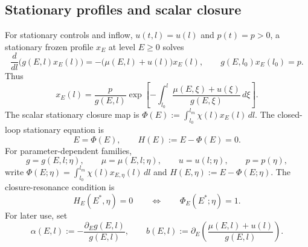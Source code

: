 \documentclass[pdflatex,sn-mathphys-num]{sn-jnl}
\theoremstyle{thmstyleone}
\theoremstyle{definition}
\theoremstyle{remark}
\numberwithin{equation}{section}
\begin{document}
\subsection{Stationary profiles and scalar closure}
\label{subsec:model-stationary}
For stationary controls and inflow,
$u(t,l)=u(l)$ and
$p(t)=p>0$,
a stationary frozen profile \(x_E\) at level \(E\ge0\) solves
\[
\frac{d}{dl}\big(g(E,l)x_E(l)\big)
=
-\big(\mu(E,l)+u(l)\big)x_E(l),
\qquad
g(E,l_0)x_E(l_0)=p .
\]
Thus
\begin{equation}
\label{eq:model-stationary-profile}
x_E(l)
=
\frac{p}{g(E,l)}
\exp\!\left[
-\int_{l_0}^{l}
\frac{\mu(E,\xi)+u(\xi)}{g(E,\xi)}\,d\xi
\right].
\end{equation}
The scalar stationary closure map is
$\displaystyle \Phi(E):=
\int_{l_0}^{l_m}\chi(l)x_E(l)\,dl$.
The closed-loop stationary equation is
\[
E=\Phi(E),
\qquad
H(E):=E-\Phi(E)=0 .
\]
For parameter-dependent families,
\[
g=g(E,l;\eta),
\qquad
\mu=\mu(E,l;\eta),
\qquad
u=u(l;\eta),
\qquad
p=p(\eta),
\]
write
$\displaystyle \Phi(E;\eta)
=
\int_{l_0}^{l_m}\chi(l)x_{E,\eta}(l)\,dl$ and
$\displaystyle H(E,\eta):=E-\Phi(E;\eta)$.
The closure-resonance condition is
\[
H_E(E^*,\eta)=0
\qquad\Longleftrightarrow\qquad
\Phi_E(E^*;\eta)=1 .
\]
For later use, set
\[
\alpha(E,l):=-\frac{\partial_E g(E,l)}{g(E,l)},
\qquad
b(E,l):=
\partial_E\left(\frac{\mu(E,l)+u(l)}{g(E,l)}\right).
\]
\end{document}
